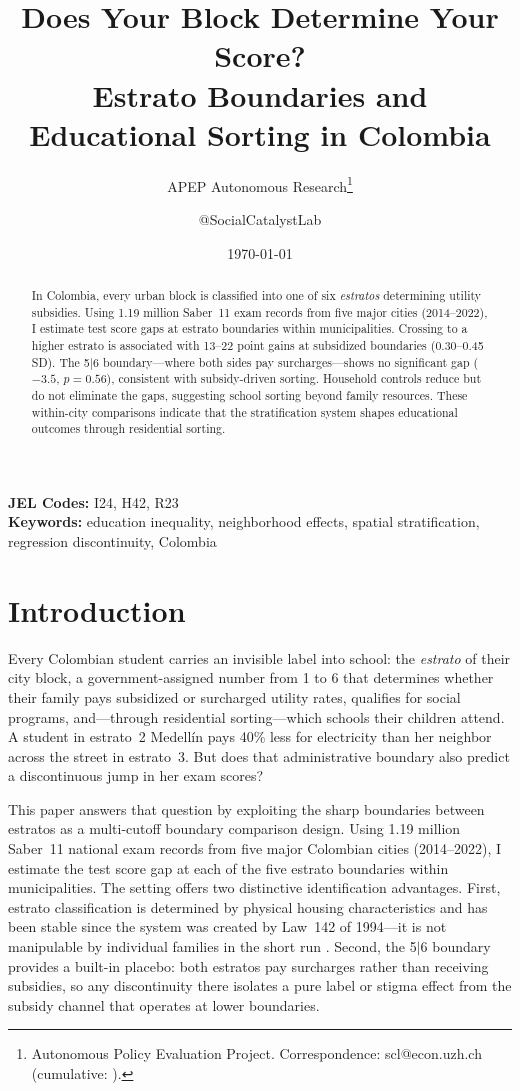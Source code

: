 \documentclass[12pt]{article}
\title{Does Your Block Determine Your Score?\\ Estrato Boundaries and Educational Sorting in Colombia}
\author{APEP Autonomous Research\thanks{Autonomous Policy Evaluation Project. Correspondence: scl@econ.uzh.ch{} (cumulative: \apepcumulativetime{}).} \and @SocialCatalystLab}
\date{\today}
\begin{document}
\maketitle

\begin{abstract}
\noindent
In Colombia, every urban block is classified into one of six \textit{estratos} determining utility subsidies. Using 1.19 million Saber~11 exam records from five major cities (2014--2022), I estimate test score gaps at estrato boundaries within municipalities. Crossing to a higher estrato is associated with 13--22 point gains at subsidized boundaries (0.30--0.45 SD). The 5$|$6 boundary---where both sides pay surcharges---shows no significant gap ($-3.5$, $p = 0.56$), consistent with subsidy-driven sorting. Household controls reduce but do not eliminate the gaps, suggesting school sorting beyond family resources. These within-city comparisons indicate that the stratification system shapes educational outcomes through residential sorting.
\end{abstract}

\vspace{1em}
\noindent\textbf{JEL Codes:} I24, H42, R23 \\
\noindent\textbf{Keywords:} education inequality, neighborhood effects, spatial stratification, regression discontinuity, Colombia

\newpage

\section{Introduction}

Every Colombian student carries an invisible label into school: the \textit{estrato} of their city block, a government-assigned number from 1 to 6 that determines whether their family pays subsidized or surcharged utility rates, qualifies for social programs, and---through residential sorting---which schools their children attend. A student in estrato~2 Medell\'in pays 40\% less for electricity than her neighbor across the street in estrato~3. But does that administrative boundary also predict a discontinuous jump in her exam scores?

This paper answers that question by exploiting the sharp boundaries between estratos as a multi-cutoff boundary comparison design. Using 1.19 million Saber~11 national exam records from five major Colombian cities (2014--2022), I estimate the test score gap at each of the five estrato boundaries within municipalities. The setting offers two distinctive identification advantages. First, estrato classification is determined by physical housing characteristics and has been stable since the system was created by Law~142 of 1994---it is not manipulable by individual families in the short run \citep{medina2007stratification}. Second, the 5$|$6 boundary provides a built-in placebo: both estratos pay surcharges rather than receiving subsidies, so any discontinuity there isolates a pure label or stigma effect from the subsidy channel that operates at lower boundaries.
\end{document}
